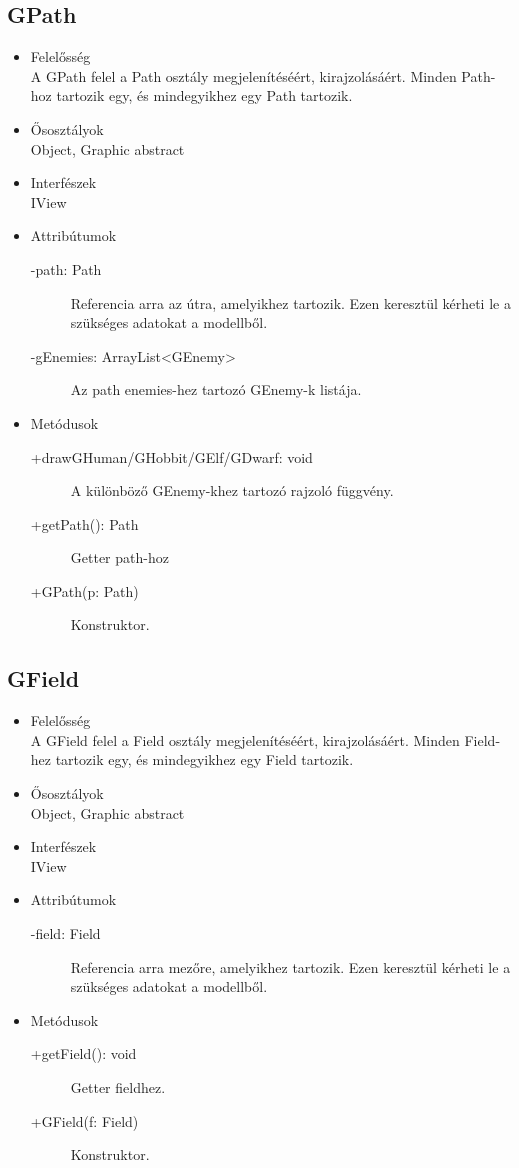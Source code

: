 \subsection{GPath}
\begin{itemize}
\item Felelősség\\
A GPath felel a Path osztály megjelenítéséért, kirajzolásáért. Minden Path-hoz tartozik egy, és mindegyikhez egy Path tartozik.
\item Ősosztályok\\
Object, Graphic abstract
\item Interfészek\\
IView
\item Attribútumok
	\begin{description}
		\item[-path: Path] Referencia arra az útra, amelyikhez tartozik. Ezen keresztül kérheti le a szükséges adatokat a modellből.
		\item[-gEnemies: ArrayList<GEnemy>] Az path enemies-hez tartozó GEnemy-k listája.
\end{description}
\item Metódusok
	\begin{description}
		\item[+drawGHuman/GHobbit/GElf/GDwarf: void] A különböző GEnemy-khez tartozó rajzoló függvény.
		\item[+getPath(): Path] Getter path-hoz
		\item[+GPath(p: Path)] Konstruktor.
	\end{description}
\end{itemize}

\subsection{GField}
\begin{itemize}
\item Felelősség\\
A GField felel a Field osztály megjelenítéséért, kirajzolásáért. Minden Field-hez tartozik egy, és mindegyikhez egy Field tartozik.
\item Ősosztályok\\
Object, Graphic abstract
\item Interfészek\\
IView
\item Attribútumok
	\begin{description}
		\item[-field: Field] Referencia arra  mezőre, amelyikhez tartozik. Ezen keresztül kérheti le a szükséges adatokat a modellből.
\end{description}
\item Metódusok
	\begin{description}
		\item[+getField(): void] Getter fieldhez.
		\item[+GField(f: Field)] Konstruktor.
	\end{description}
\end{itemize}

